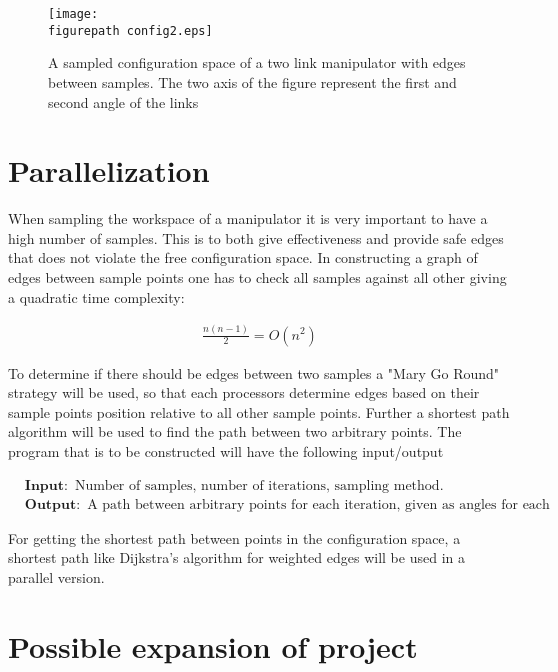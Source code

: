 \begin{figure}[h!] 
 \center 
 \texttt{[image: \\figurepath config2.eps]}
 \caption{ A sampled configuration space of a two link manipulator with edges between samples. The two axis of the figure represent the first and second angle of the links \label{fig:c1}}
 \end{figure}



\section*{Parallelization}
When sampling the workspace of a manipulator it is very important to have a high number of samples. This is to both give effectiveness and provide safe edges that does not violate the free configuration space. In constructing a graph of edges between sample points one has to check all samples against all other giving a quadratic time complexity:

\begin{align}
\label{eq:}
 \frac{n(n-1)}{2}=O(n^2) 
 \end{align}

To determine if there should be edges between two samples a "Mary Go Round" strategy will be used, so that each processors determine edges based on their sample points position relative to all other sample points. Further a shortest path algorithm will be used to find the path between two arbitrary points. 
The program that is to be constructed will have the following input/output

\begin{align}
\label{eq:}
&\mathbf{Input: } \text{ Number of samples, number of iterations, sampling method. } \nonumber \\
 &\mathbf{Output: } \text{ A path between arbitrary points for each iteration, given as angles for each joint in the manipulator.} \nonumber
 \end{align}

For getting the shortest path between points in the configuration space, a shortest path like Dijkstra's algorithm for weighted edges will be used in a parallel version. 

\section*{Possible expansion of project}


